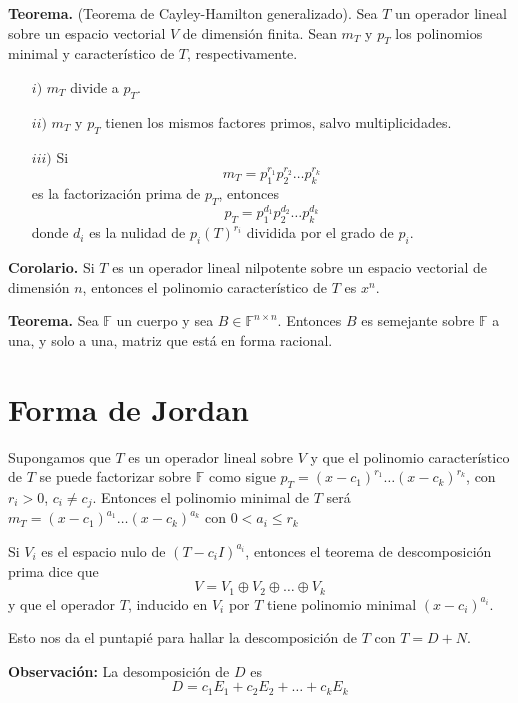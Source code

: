 \newpage


\textbf{Teorema.} (Teorema de Cayley-Hamilton generalizado). Sea $T$
un operador lineal sobre un espacio vectorial $V$ de dimensión finita.
Sean $m_T$ y $p_T$ los polinomios minimal y característico de $T$,
respectivamente.
\begin{itemize}
    \item[$i)$]  $m_T$ divide a $p_T$.
    \item[$ii)$]  $m_T$ y $p_T$ tienen los mismos factores primos,
    salvo multiplicidades.
    \item[$iii)$] Si $$m_T=p_1^{r_1}p_2^{r_2}\dots p_k^{r_k}$$
    es la factorización prima de $p_T$, entonces
    $$p_T=p_1^{d_1}p_2^{d_2}\dots p_k^{d_k}$$
    donde $d_i$ es la nulidad de $p_i(T)^{r_i}$ dividida por el grado de $p_i$.
\end{itemize}

\textbf{Corolario.} Si $T$ es un operador lineal nilpotente
sobre un espacio vectorial de dimensión $n$, entonces el
polinomio característico de $T$ es $x^{n}$.

\textbf{Teorema.} Sea $\mathbb{F}$ un cuerpo y sea $B\in
\mathbb{F}^{n\times n}$. Entonces $B$ es semejante sobre
$\mathbb{F}$ a una, y solo a una, matriz que está en forma
racional.

\section{Forma de Jordan}

Supongamos que $T$ es un operador lineal sobre $V$ y
que el polinomio característico de $T$ se puede factorizar
sobre $\mathbb{F}$ como sigue $p_T=(x-c_1)^{r_1}\dots (x-c_k)^{r_k}$,
con $r_i>0$, $c_i\not = c_j$. Entonces el polinomio minimal
de $T$ será $m_T=(x-c_1)^{a_1}\dots (x-c_k)^{a_k}$
con $0<a_i\leq r_k$

Si $V_i$ es el espacio nulo de $(T-c_iI)^{a_i}$, entonces
el teorema de descomposición prima dice que
$$V=V_1\oplus V_2 \oplus \dots \oplus V_k$$
y que el operador $T$, inducido en $V_i$ por $T$ tiene
polinomio minimal $(x - c_i)^{a_i}$.

Esto nos da el puntapié para hallar la descomposición de $T$
con $T=D+N$.

\textbf{Observación:} La desomposición de $D$ es
$$D = c_1E_1 + c_2E_2 + \dots + c_kE_k$$